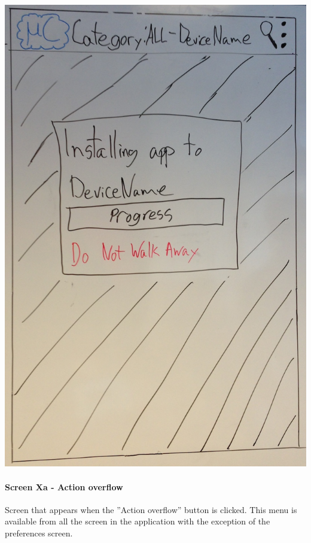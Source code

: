 \begin{image}[H]
\includegraphics[scale=0.2]{images/Design_guide/Screen3a-ii.png}
\end{image}


\paragraph{Screen Xa - Action overflow}
Screen that appears when the ''Action overflow'' button is clicked. This menu is available from all the screen in the application with the exception of the preferences screen.

